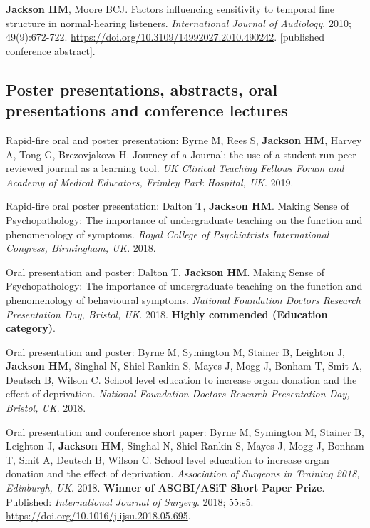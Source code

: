 \documentclass[a4paper, oneside, final, 11pt]{scrartcl} %
\begin{document}
\bigskip

\textbf{Jackson HM}, Moore BCJ. Factors influencing sensitivity to temporal fine structure in normal-hearing listeners. \textit{International Journal of Audiology}. 2010; 49(9):672-722. \url{https://doi.org/10.3109/14992027.2010.490242}. [published conference abstract].

\bigskip



\subsection*{Poster presentations, abstracts, oral presentations and conference lectures}

Rapid-fire oral and poster presentation: Byrne M, Rees S, \textbf{Jackson HM}, Harvey A, Tong G, Brezovjakova H. Journey of a Journal: the use of a student-run peer reviewed journal as a learning tool. \textit{UK Clinical Teaching Fellows Forum and Academy of Medical Educators, Frimley Park Hospital, UK}. 2019.

\bigskip

Rapid-fire oral poster presentation: Dalton T, \textbf{Jackson HM}. Making Sense of Psychopathology: The importance of undergraduate teaching on the function and phenomenology of symptoms. \textit{Royal College of Psychiatrists International Congress, Birmingham, UK}. 2018.

\bigskip

Oral presentation and poster: Dalton T, \textbf{Jackson HM}. Making Sense of Psychopathology: The importance of undergraduate teaching on the function and phenomenology of behavioural symptoms. \textit{National Foundation Doctors Research Presentation Day, Bristol, UK}. 2018. \textbf{Highly commended (Education category)}.

\bigskip

Oral presentation and poster: Byrne M, Symington M, Stainer B, Leighton J, \textbf{Jackson HM}, Singhal N, Shiel-Rankin S, Mayes J, Mogg J, Bonham T, Smit A, Deutsch B, Wilson C. School level education to increase organ donation and the effect of deprivation. \textit{National Foundation Doctors Research Presentation Day, Bristol, UK}. 2018.

\bigskip

Oral presentation and conference short paper: Byrne M, Symington M, Stainer B, Leighton J, \textbf{Jackson HM}, Singhal N, Shiel-Rankin S, Mayes J, Mogg J, Bonham T, Smit A, Deutsch B, Wilson C. School level education to increase organ donation and the effect of deprivation. \textit{Association of Surgeons in Training 2018, Edinburgh, UK}. 2018. \textbf{Winner of ASGBI/ASiT Short Paper Prize}. Published: \textit{International Journal of Surgery}. 2018; 55:s5. \url{https://doi.org/10.1016/j.ijsu.2018.05.695}.
\end{document}
